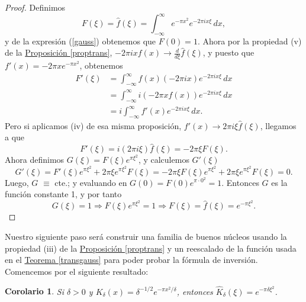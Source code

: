 \documentclass[12pt]{article}
\theoremstyle{plain}
\newtheorem{corolario}[teorema]{Corolario}
\theoremstyle{definition}
\numberwithin{equation}{section}
\begin{document}
            \begin{proof}
                Definimos 
                $$ F(\xi) = \hat{f}(\xi) = \int_{-\infty}^{\infty}  e^{-\pi x^2} e^{-2\pi i x \xi} \,dx, $$ 
                y de la expresión (\ref{gauss}) obtenemos que \(F(0) = 1\). Ahora por la propiedad (v) de la \hyperref[proptrans]{Proposición \ref*{proptrans}}, \(-2\pi i xf(x) \to \frac{d}{d\xi}\hat{f}(\xi)\), y puesto que \(f'(x) = -2\pi xe^{-\pi x^2}\), obtenemos 
                \begin{align*}
                    F'(\xi) &= \int_{-\infty}^{\infty}  f(x) (-2\pi ix) e^{-2\pi i x \xi} \,dx\\
                    &= \int_{-\infty}^{\infty}  i (-2\pi x f(x) ) e^{-2\pi i x \xi} \,dx\\
                    &= i \int_{-\infty}^{\infty} f'(x) e^{-2\pi i x \xi}\,dx.
                \end{align*}
                Pero si aplicamos (iv) de esa misma proposición, \(f'(x) \to 2\pi i\xi \hat{f}(\xi)\), llegamos a que
                \begin{equation*}
                    F'(\xi) = i(2\pi i \xi)\hat{f}(\xi) = -2\pi \xi F(\xi).
                \end{equation*}
                Ahora definimos \(G(\xi) = F(\xi)e^{\pi \xi^2}\), y calculemos \(G'(\xi)\)
                $$ G'(\xi) = F'(\xi) e^{\pi \xi^2} + 2\pi \xi e^{\pi \xi^2}F(\xi) = -2\pi \xi F(\xi)e^{\pi \xi^2} + 2\pi \xi e^{\pi \xi^2}F(\xi) = 0.$$ 
                Luego, $G$ $\equiv$ cte.; y evaluando en \(G(0) = F(0) e^{\pi \cdot 0^2} = 1\). Entonces \(G\) es la función constante 1, y por tanto
                $$ G(\xi) = 1 \Rightarrow F(\xi) e^{\pi \xi^2} = 1 \Rightarrow F(\xi) = \hat{f}(\xi) = e^{-\pi \xi^2} .$$
            \end{proof}
            Nuestro siguiente paso será construir una familia de buenos núcleos usando la propiedad (iii) de la \hyperref[proptrans]{Proposición \ref*{proptrans}} y un reescalado de la función usada en el \hyperref[transgauss]{Teorema \ref*{transgauss}} para poder probar la fórmula de inversión. Comencemos por el siguiente resultado:
            \begin{corolario}
                Si $\delta > 0$ y $K_\delta(x) = \delta^{-1/2} e^{-\pi x^2 / \delta}$, entonces $\widehat{K}_\delta(\xi) = e^{-\pi \delta \xi^2}$.
            \end{corolario}
\end{document}
